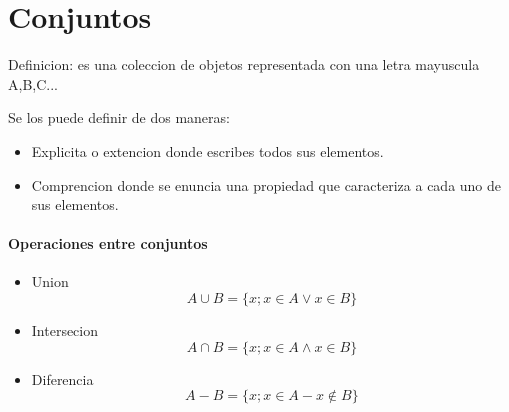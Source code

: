 \documentclass[a4paper]{article}
\begin{document}
\section{Conjuntos}
\begin{description}
	\item Definicion: es una coleccion de objetos representada con una letra mayuscula A,B,C...
	\item Se los puede definir de dos maneras:
\end{description}
\begin{itemize}
	\item Explicita o extencion donde escribes todos sus elementos. 
	\item Comprencion donde se enuncia una propiedad  que caracteriza a cada uno de sus elementos.
\end{itemize}



\paragraph{Operaciones entre conjuntos}
\begin{itemize}

\item Union
	\begin{equation}
		A \cup B = \{x; x \in A  \vee x \in  B\}
	\end{equation}

\item Intersecion
	\begin{equation}
		A \cap B = \{x; x \in A  \wedge x \in  B\}
	\end{equation}

\item Diferencia
	\begin{equation}
		A - B = \{x; x \in  A - x \notin B\}
	\end{equation}
\end{itemize}
\end{document}
